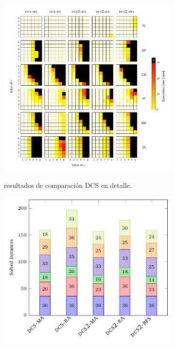 \begin{figure}[th]
    \centering
    \hspace*{-20mm}
    \begin{subfigure}{0.7\textwidth}
        \includegraphics[width=\linewidth]{figures/benchmark/dcs_vs.pdf}\label{fig:dcs:results:detailed}
        \caption{resultados de comparación DCS en detalle.}
    \end{subfigure}%
    \begin{subfigure}{0.5\textwidth}
        \includegraphics[width=0.9\linewidth]{figures/benchmark/dcs_instances.pdf}\label{fig:dcs:results:instances}

\end{subfigure}
\end{figure}
